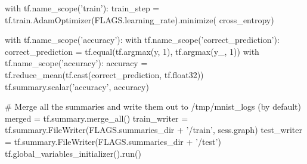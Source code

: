 \begin{pythoncode}
 with tf.name_scope('train'):
   train_step = tf.train.AdamOptimizer(FLAGS.learning_rate).minimize(
       cross_entropy)
 
 with tf.name_scope('accuracy'):
   with tf.name_scope('correct_prediction'):
     correct_prediction = tf.equal(tf.argmax(y, 1), tf.argmax(y_, 1))
   with tf.name_scope('accuracy'):
     accuracy = tf.reduce_mean(tf.cast(correct_prediction, tf.float32))
 tf.summary.scalar('accuracy', accuracy)
 
 # Merge all the summaries and write them out to /tmp/mnist_logs (by default)
 merged = tf.summary.merge_all()
 train_writer = tf.summary.FileWriter(FLAGS.summaries_dir + '/train',
                                       sess.graph)
 test_writer = tf.summary.FileWriter(FLAGS.summaries_dir + '/test')
 tf.global_variables_initializer().run()
 \end{pythoncode}
